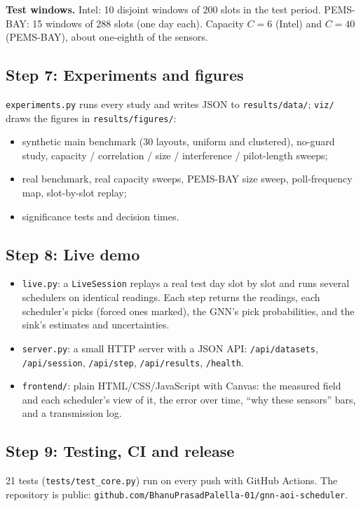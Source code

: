 \textbf{Test windows.} Intel: 10 disjoint windows of 200 slots in the test period. PEMS-BAY: 15 windows of 288 slots
(one day each). Capacity $C=6$ (Intel) and $C=40$ (PEMS-BAY), about one-eighth of the sensors.

\subsection{Step 7: Experiments and figures}
\texttt{experiments.py} runs every study and writes JSON to \texttt{results/data/}; \texttt{viz/} draws the figures in
\texttt{results/figures/}:
\begin{itemize}
  \item synthetic main benchmark (30 layouts, uniform and clustered), no-guard study, capacity / correlation / size /
        interference / pilot-length sweeps;
  \item real benchmark, real capacity sweeps, PEMS-BAY size sweep, poll-frequency map, slot-by-slot replay;
  \item significance tests and decision times.
\end{itemize}

\subsection{Step 8: Live demo}
\begin{itemize}
  \item \texttt{live.py}: a \texttt{LiveSession} replays a real test day slot by slot and runs several schedulers on
        identical readings. Each step returns the readings, each scheduler's picks (forced ones marked), the GNN's pick
        probabilities, and the sink's estimates and uncertainties.
  \item \texttt{server.py}: a small HTTP server with a JSON API: \texttt{/api/datasets}, \texttt{/api/session},
        \texttt{/api/step}, \texttt{/api/results}, \texttt{/health}.
  \item \texttt{frontend/}: plain HTML/CSS/JavaScript with Canvas: the measured field and each scheduler's view of it,
        the error over time, ``why these sensors'' bars, and a transmission log.
\end{itemize}

\subsection{Step 9: Testing, CI and release}
21 tests (\texttt{tests/test\_core.py}) run on every push with GitHub Actions. The repository is public:
\texttt{github.com/BhanuPrasadPalella-01/gnn-aoi-scheduler}.

